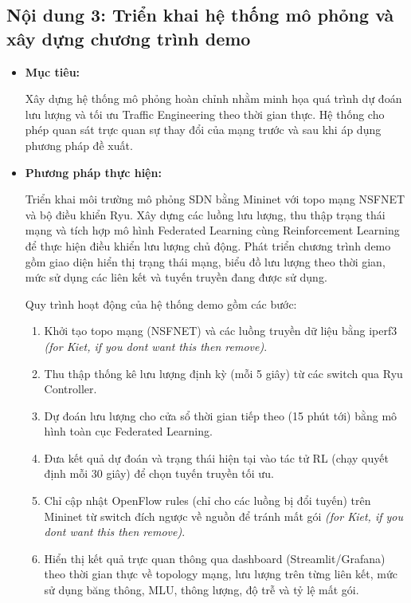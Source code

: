 \subsection{Nội dung 3: Triển khai hệ thống mô phỏng và xây dựng chương trình demo}

\begin{itemize}
    \item \textbf{Mục tiêu:}

    Xây dựng hệ thống mô phỏng hoàn chỉnh nhằm minh họa quá trình dự đoán lưu lượng và tối ưu Traffic Engineering theo thời gian thực. Hệ thống cho phép quan sát trực quan sự thay đổi của mạng trước và sau khi áp dụng phương pháp đề xuất.

    \item \textbf{Phương pháp thực hiện:}

   Triển khai môi trường mô phỏng SDN bằng Mininet với topo mạng NSFNET và bộ điều khiển Ryu. Xây dựng các luồng lưu lượng, thu thập trạng thái mạng và tích hợp mô hình Federated Learning cùng Reinforcement Learning để thực hiện điều khiển lưu lượng chủ động. Phát triển chương trình demo gồm giao diện hiển thị trạng thái mạng, biểu đồ lưu lượng theo thời gian, mức sử dụng các liên kết và tuyến truyền đang được sử dụng.

    Quy trình hoạt động của hệ thống demo gồm các bước:
    \begin{enumerate}
        \item Khởi tạo topo mạng (NSFNET) và các luồng truyền dữ liệu bằng iperf3 \textit{(for Kiet, if you dont want this then remove)}.
        \item Thu thập thống kê lưu lượng định kỳ (mỗi 5 giây) từ các switch qua Ryu Controller.
        \item Dự đoán lưu lượng cho cửa sổ thời gian tiếp theo (15 phút tới) bằng mô hình toàn cục Federated Learning.
        \item Đưa kết quả dự đoán và trạng thái hiện tại vào tác tử RL (chạy quyết định mỗi 30 giây) để chọn tuyến truyền tối ưu.
        \item Chỉ cập nhật OpenFlow rules (chỉ cho các luồng bị đổi tuyến) trên Mininet từ switch đích ngược về nguồn để tránh mất gói \textit{(for Kiet, if you dont want this then remove)}.
        \item Hiển thị kết quả trực quan thông qua dashboard (Streamlit/Grafana) theo thời gian thực về topology mạng, lưu lượng trên từng liên kết, mức sử dụng băng thông, MLU, thông lượng, độ trễ và tỷ lệ mất gói.
    \end{enumerate}
\end{itemize}

